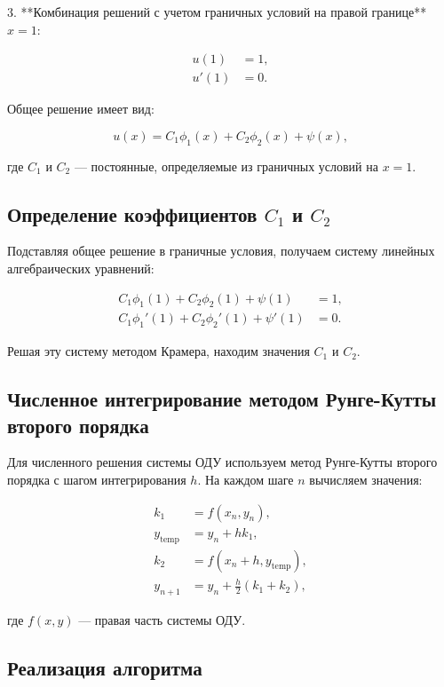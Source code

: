 \documentclass{article}
\begin{document}
3. **Комбинация решений с учетом граничных условий на правой границе** $x = 1$:

   \begin{align}
   u(1) &= 1, \\
   u'(1) &= 0.
   \end{align}

   Общее решение имеет вид:

   \begin{equation}
   u(x) = C_1 \phi_1(x) + C_2 \phi_2(x) + \psi(x),
   \end{equation}

   где $C_1$ и $C_2$ — постоянные, определяемые из граничных условий на $x = 1$.

\subsection{Определение коэффициентов $C_1$ и $C_2$}

Подставляя общее решение в граничные условия, получаем систему линейных алгебраических уравнений:

\begin{align}
C_1 \phi_1(1) + C_2 \phi_2(1) + \psi(1) &= 1, \\
C_1 \phi_1'(1) + C_2 \phi_2'(1) + \psi'(1) &= 0.
\end{align}

Решая эту систему методом Крамера, находим значения $C_1$ и $C_2$.

\subsection{Численное интегрирование методом Рунге-Кутты второго порядка}

Для численного решения системы ОДУ используем метод Рунге-Кутты второго порядка с шагом интегрирования $h$. На каждом шаге $n$ вычисляем значения:

\begin{align}
k_1 &= f(x_n, y_n), \\
y_{\text{temp}} &= y_n + h k_1, \\
k_2 &= f(x_n + h, y_{\text{temp}}), \\
y_{n+1} &= y_n + \frac{h}{2} (k_1 + k_2),
\end{align}

где $f(x, y)$ — правая часть системы ОДУ.

\subsection{Реализация алгоритма}
\end{document}
